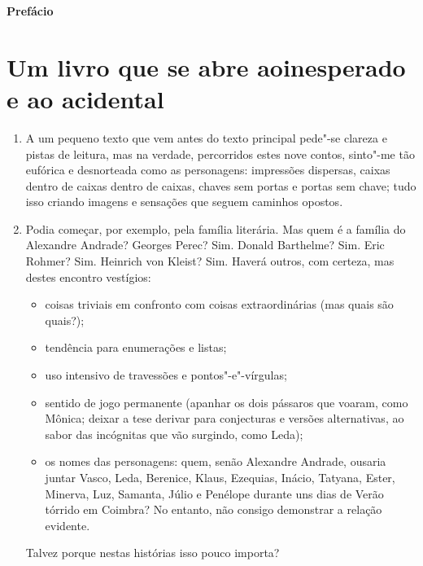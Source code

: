 \movetooddpage\vspace*{1.8cm}
\noindent{}\textbf{Prefácio}
\bigskip


\section{Um livro que se abre ao\break inesperado e ao acidental}

\medskip

\begin{enumerate}
\item A um pequeno texto que vem antes do texto principal pede"-se clareza e
pistas de leitura, mas na verdade, percorridos estes nove contos,
sinto"-me tão eufórica e desnorteada como as personagens: impressões
dispersas, caixas dentro de caixas dentro de caixas, chaves sem portas e
portas sem chave; tudo isso criando imagens e sensações que seguem
caminhos opostos.

\item Podia começar, por exemplo, pela família literária. Mas quem é a
família do Alexandre Andrade? Georges Perec? Sim. Donald Barthelme? Sim. Eric Rohmer? Sim.
Heinrich von Kleist? Sim. Haverá outros, com certeza, mas destes encontro vestígios:

\begin{itemize}
\item{} coisas triviais em confronto com coisas extraordinárias (mas quais
são quais?);

\item{} tendência para enumerações e listas;

\item{} uso intensivo de travessões e pontos"-e"-vírgulas;

\item{} sentido de jogo permanente (apanhar os dois pássaros que voaram, como
Mônica; deixar a tese derivar para conjecturas e versões alternativas, ao sabor das incógnitas que vão
surgindo, como Leda);

\item{} os nomes das personagens: quem, senão Alexandre Andrade, ousaria
juntar Vasco, Leda, Berenice, Klaus, Ezequias, Inácio, Tatyana, Ester,
Minerva, Luz, Samanta, Júlio e Penélope durante uns dias de Verão
tórrido em Coimbra? No entanto, não consigo demonstrar a relação
evidente.
\end{itemize}

Talvez porque nestas histórias isso pouco importa?


\end{enumerate}
